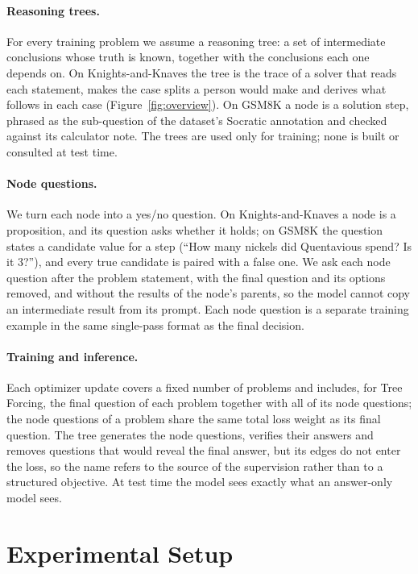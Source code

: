 \documentclass[10pt]{article}
\newcommand{\tf}{Tree Forcing}
\begin{document}
\paragraph{Reasoning trees.} For every training problem we assume a reasoning tree: a set of intermediate conclusions
whose truth is known, together with the conclusions each one depends on. On Knights-and-Knaves the tree is the trace of
a solver that reads each statement, makes the case splits a person would make and derives what follows in each case
(Figure~\ref{fig:overview}). On GSM8K a node is a solution step, phrased as the sub-question of the dataset's Socratic
annotation and checked against its calculator note. The trees are used only for training; none is built or consulted
at test time.

\paragraph{Node questions.} We turn each node into a yes/no question. On Knights-and-Knaves a node is a proposition,
and its question asks whether it holds; on GSM8K the question states a candidate value for a step (``How many nickels
did Quentavious spend? Is it 3?''), and every true candidate is paired with a false one. We ask each node question
after the problem statement, with the final question and its options removed, and without the results of the node's
parents, so the model cannot copy an intermediate result from its prompt. Each node question is a separate training
example in the same single-pass format as the final decision.

\paragraph{Training and inference.} Each optimizer update covers a fixed number of problems and includes, for \tf{},
the final question of each problem together with all of its node questions; the node questions of a problem share the
same total loss weight as its final question. The tree generates the node questions, verifies their answers and removes
questions that would reveal the final answer, but its edges do not enter the loss, so the name refers to the source of
the supervision rather than to a structured objective. At test time the model sees exactly what an answer-only model
sees.
\section{Experimental Setup}
\label{sec:setup}
\end{document}
